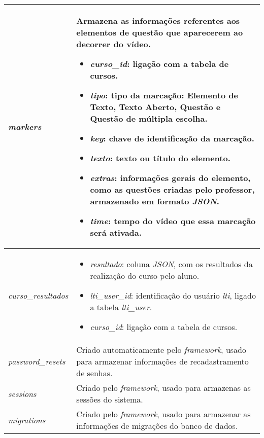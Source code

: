 \begin{anexosenv}
\begin{longtable}{|p{}|p{}|}
        \hline \textit{markers} &
        Armazena as informações referentes aos elementos de questão que aparecerem ao decorrer do vídeo.
        
        \begin{itemize}
            \item \textit{curso\_id}: ligação com a tabela de cursos.
            \item \textit{tipo}: tipo da marcação: Elemento de Texto, Texto Aberto, Questão e Questão de múltipla escolha.
            \item \textit{key}: chave de identificação da marcação.
            \item \textit{texto}: texto ou título do elemento.
            \item \textit{extras}: informações gerais do elemento, como as questões criadas pelo professor, armazenado em formato \textit{JSON}.
            \item \textit{time}: tempo do vídeo que essa marcação será ativada.
        \end{itemize}
        \\
        
        \hline \textit{curso\_resultados} &
        \begin{itemize}
            \item \textit{resultado}: coluna \textit{JSON}, com os resultados da realização do curso pelo aluno.
            \item \textit{lti\_user\_id}: identificação do usuário \textit{lti}, ligado a tabela \textit{lti\_user}.
            \item \textit{curso\_id}: ligação com a tabela de cursos.
        \end{itemize}
        \\
        
        \hline \textit{password\_resets} &
        Criado automaticamente pelo \textit{framework}, usado para armazenar informações de recadastramento de senhas.
        \\
        
        \hline \textit{sessions} &
        Criado pelo \textit{framework}, usado para armazenas as sessões do sistema.
        \\
        
        \hline \textit{migrations} &
        Criado pelo \textit{framework}, usado para armazenar as informações de migrações do banco de dados.
        \\
        

\end{longtable}
\end{anexosenv}
